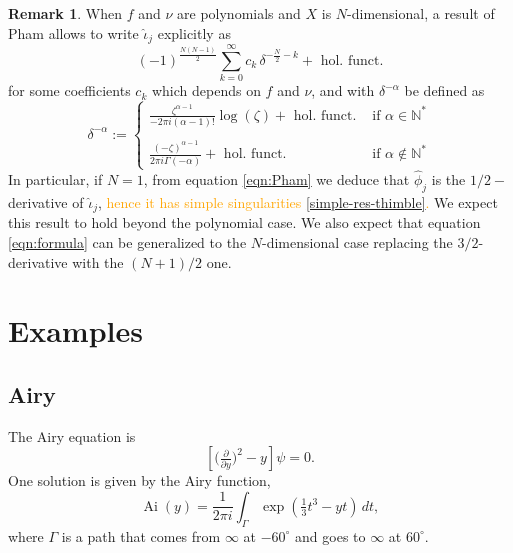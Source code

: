 \documentclass{article}
\theoremstyle{definition}
\DeclareMathOperator{\Ai}{Ai}
\newtheorem{remark}[definition]{Remark}
\theoremstyle{plain}
\begin{document}
\begin{remark}\label{rmk:Pham formula}
    When $f$ and $\nu$ are polynomials and $X$ is $N$-dimensional, a result of Pham \cite[Equation 2.4, II partie]{pham} allows to write $\hat{\iota}_j$ explicitly as 
    \begin{equation}\label{eqn:Pham}
        (-1)^{\frac{N(N-1)}{2}}  \sum_{k=0}^\infty c_k\, \delta^{-\frac{N}{2}-k}+ \text{ hol. funct.}
    \end{equation}
    for some coefficients $c_k$ which depends on $f$ and $\nu$, and with $\delta^{-\alpha}$ be defined as
   \begin{equation*}
       \delta^{-\alpha}:=\begin{cases}
           \frac{\zeta^{\alpha-1}}{-2\pi i(\alpha-1)!}\log(\zeta) + \text{ hol. funct.} & \text{ if } \alpha\in\mathbb{N}^*\\
           & \\
           \frac{(-\zeta)^{\alpha-1}}{2\pi i \Gamma(-\alpha)}+ \text{ hol. funct.} & \text{ if } \alpha\notin \mathbb{N}^* 
       \end{cases}
   \end{equation*}
In particular, if $N=1$, from equation \eqref{eqn:Pham} we deduce that $\hat{\phi}_j$ is the $1/2-$ derivative of $\hat{\iota}_j$, \textcolor{orange}{hence it has simple singularities \ref{simple-res-thimble}.} We expect this result to hold beyond the polynomial case. We also expect that equation \eqref{eqn:formula} can be generalized to the $N$-dimensional case replacing the $3/2$-derivative with the $(N+1)/2$ one. 
\end{remark}
\section{Examples}\label{sec:examples}

\subsection{Airy}

The Airy equation is
\begin{equation}\label{eqn:airy}
\left[\big(\tfrac{\partial}{\partial y}\big)^2 - y\right] \psi = 0.
\end{equation}
One solution is given by the Airy function,
\[ \Ai(y) = \frac{1}{2\pi i} \int_{\Gamma} \exp\left(\tfrac{1}{3}t^3 - yt\right)\,dt, \]
where $\Gamma$ is a path that comes from $\infty$ at $-60^\circ$ and goes to $\infty$ at $60^\circ$.
\end{document}
